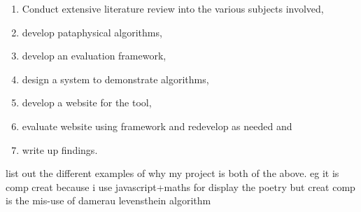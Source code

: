 \begin{enumerate}
  \item Conduct extensive literature review into the various subjects involved,
  \item develop pataphysical algorithms,
  \item develop an evaluation framework,
  \item design a system to demonstrate algorithms,
  \item develop a website for the tool,
  \item evaluate website using framework and redevelop as needed and
  \item write up findings.
\end{enumerate}


\begin{draft}
  list out the different examples of why my project is both of the above. 
  eg it is comp creat because i use javascript+maths for display the poetry
  but creat comp is the mis-use of damerau levensthein algorithm
\end{draft}


\stopcontents[chapters]
